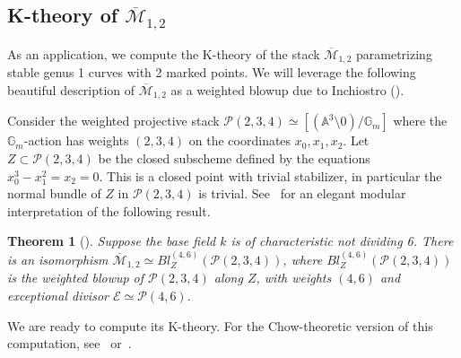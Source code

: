\documentclass[12pt]{amsart}
\newcommand\Gm{\mathbb{G}_m}
\newcommand\A{\mathbb{A}}
\newcommand{\cE}{\mathcal{E}}
\newcommand{\cM}{\mathcal{M}}
\newcommand{\cP}{\mathcal{P}}
\newtheorem{Thm}[theorem]{Theorem}
\theoremstyle{definition}
\begin{document}
\subsection{K-theory of $\overline{\cM}_{1,2}$}\label{sub:K-theory-M-12}

As an application, we compute the K-theory of the stack $\overline{\cM}_{1,2}$ parametrizing stable genus 1 curves with 2 marked points. We will leverage the following beautiful description of $\overline{\cM}_{1,2}$ as a weighted blowup due to Inchiostro (\cite{Inchiostro}).

Consider the weighted projective stack $\cP(2,3,4)\simeq[(\A^3\setminus0)/\Gm]$ where the $\Gm$-action has weights $(2,3,4)$ on the coordinates $x_0,x_1,x_2$. Let $Z\subset\cP(2,3,4)$ be the closed subscheme defined by the equations $x_0^3-x_1^2=x_2=0$. This is a closed point with trivial stabilizer, in particular the normal bundle of $Z$ in $\cP(2,3,4)$ is trivial. See~\cite{Inchiostro} for an elegant modular interpretation of the following result.

\begin{Thm}[{\cite[Theorem 2.10]{Inchiostro}}]
    Suppose the base field $k$ is of characteristic not dividing 6. There is an isomorphism $\overline{\cM}_{1,2}\simeq Bl_{Z}^{(4,6)}(\cP(2,3,4))$, where $Bl_{Z}^{(4,6)}(\cP(2,3,4))$ is the weighted blowup of $\cP(2,3,4)$ along $Z$, with weights $(4,6)$ and exceptional divisor $\cE\simeq\cP(4,6)$.
\end{Thm}

We are ready to compute its K-theory. For the Chow-theoretic version of this computation, see~\cite[Theorem 4.12]{Inchiostro} or~\cite[Proposition 6.7]{Arena-Obinna}.
\end{document}
